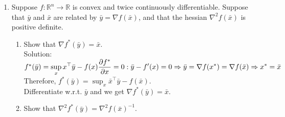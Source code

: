 \documentclass[12pt]{amsart}
\newcommand{\grad}{\nabla}
\begin{document}
\begin{enumerate}
\item Suppose $f: \mathbb{R}^n \rightarrow \mathbb{R}$ is convex and twice continuously differentiable. Suppose that $\bar y$ and $\bar x$ 
are related by $\bar y = \nabla f(\bar x)$, and that the hessian $\nabla^2 f(\bar x)$ is positive definite. 

\begin{enumerate}
\item  Show that $\nabla f^* (\bar y) = \bar x$. \\

\noindent
Solution:\\
$f^*(\bar y) = \displaystyle \sup_x x^\top \bar y - f(x)\\
\frac{\partial f^*}{\partial x} = 0 : \bar y - f'(x) = 0 \Rightarrow \bar y = \grad f(x^*) = \grad f(\bar x) \Rightarrow x^* = \bar x $\\

Therefore, $f^*(\bar y) = \displaystyle \sup_x \bar x^\top \bar y - f(\bar x)$.\\
Differentiate w.r.t. $\bar y$ and we get $\grad f^*(\bar y) = \bar x$.\\

\item Show that $\nabla^2 f^* (\bar y) = \nabla^2 f(\bar x)^{-1}$.

\end{enumerate}

\end{enumerate}
\end{document}
